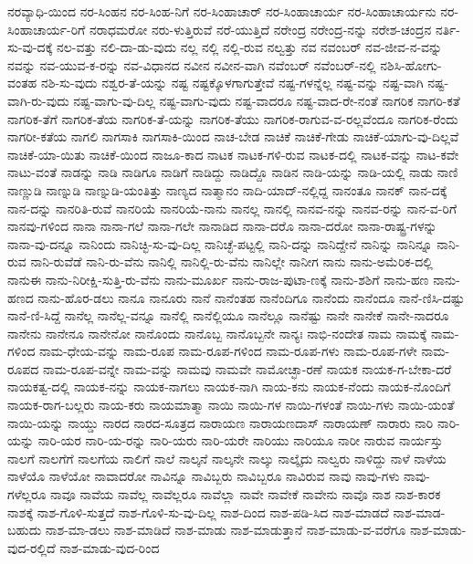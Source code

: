 {ನರವ್ಯಾಧಿ-ಯಿಂದ
ನರ-ಸಿಂಹನ
ನರ-ಸಿಂಹ-ನಿಗೆ
ನರ-ಸಿಂಹಾಚಾರ್
ನರ-ಸಿಂಹಾಚಾರ್ಯ
ನರ-ಸಿಂಹಾಚಾರ್ಯನು
ನರ-ಸಿಂಹಾಚಾರ್ಯ-ರಿಗೆ
ನರಾಧಮರೋ
ನರು-ಳುತ್ತಿರುವೆ
ನರೆ-ಯುತ್ತಿದೆ
ನರೇಂದ್ರ
ನರೇಂದ್ರ-ನನ್ನು
ನರೇಶ-ಚಂದ್ರನ
ನರ್ತಿ-ಸು-ವು-ದಕ್ಕೆ
ನಲ-ವತ್ತು
ನಲಿ-ದಾ-ಡು-ವುದು
ನಲ್ಲ
ನಲ್ಲಿ
ನಲ್ಲಿ-ರುವ
ನಲ್ವತ್ತು
ನವ
ನವಂಬರ್
ನವ-ಜೀವ-ನ-ವನ್ನು
ನವನ್ನು
ನವ-ಯುವ-ಕ-ರನ್ನು
ನವ-ವಿಧಾನದ
ನವೀನ
ನವೀನ-ವಾಗಿ
ನವೆಂಬರ್
ನವೆಂಬರ್-ನಲ್ಲಿ
ನಶಿಸಿ-ಹೋಗು-ವಂತಹ
ನಶಿ-ಸು-ವುದು
ನಶ್ವರ-ತೆ-ಯನ್ನು
ನಷ್ಟ
ನಷ್ಟಕ್ಕೊಳಗಾಗುತ್ತೇವೆ
ನಷ್ಟ-ಗಳನ್ನೆಲ್ಲ
ನಷ್ಟ-ವನ್ನು
ನಷ್ಟ-ವಾಗಿ
ನಷ್ಟ-ವಾಗಿ-ರು-ವುದು
ನಷ್ಟ-ವಾಗು-ವು-ದಿಲ್ಲ
ನಷ್ಟ-ವಾಗು-ವುದು
ನಷ್ಟ-ವಾದರೂ
ನಷ್ಟ-ವಾದ-ರೇ-ನಂತೆ
ನಾಗರಿಕ
ನಾಗರಿ-ಕತೆ
ನಾಗರಿಕ-ತೆಗೆ
ನಾಗರಿಕ-ತೆಯ
ನಾಗರಿಕ-ತೆ-ಯನ್ನು
ನಾಗರಿಕ-ತೆಯು
ನಾಗರಿಕ-ರಾಗುವ-ವ-ರಲ್ಲವೆಂದೂ
ನಾಗರಿಕ-ರೆಂದು
ನಾಗರೀ-ಕತೆಯ
ನಾಗಲಿ
ನಾಗಸಾಕಿ
ನಾಗಸಾಕಿ-ಯಿಂದ
ನಾಚ-ಬೇಡ
ನಾಚಿಕೆ
ನಾಚಿಕೆ-ಗೇಡು
ನಾಚಿಕೆ-ಯಾಗು-ವು-ದಿಲ್ಲವೆ
ನಾಚಿಕೆ-ಯಾ-ಯಿತು
ನಾಚಿಕೆ-ಯಿಂದ
ನಾಜೂ-ಕಾದ
ನಾಟಕ
ನಾಟಕ-ಗಳಿ-ರುವ
ನಾಟಕ-ದಲ್ಲಿ
ನಾಟಕ-ವನ್ನು
ನಾಟ-ಕವೇ
ನಾಟು-ವಂತೆ
ನಾಡನ್ನು
ನಾಡಿ
ನಾಡಿಗೂ
ನಾಡಿಗೆ
ನಾಡಿದ್ದು
ನಾಡಿದ್ದೊ
ನಾಡಿನ
ನಾಡಿ-ಯನ್ನು
ನಾಡಿ-ಯಲ್ಲಿ
ನಾಡು
ನಾಣಿ
ನಾಣ್ಣುಡಿ
ನಾಣ್ನುಡಿ
ನಾಣ್ನುಡಿ-ಯಂತಿತ್ತು
ನಾಣ್ಯದ
ನಾತ್ಮಾನಂ
ನಾದಿ-ಯಾದ್-ನಲ್ಲಿದ್ದ
ನಾನಂತೂ
ನಾನಕ್
ನಾನ-ದಕ್ಕೆ
ನಾನ-ದನ್ನು
ನಾನರಿತಿ-ರುವೆ
ನಾನರಿಯೆ
ನಾನರಿಯೆ-ನಾನು
ನಾನಲ್ಲ
ನಾನಲ್ಲಿ
ನಾನವ-ನನ್ನು
ನಾನವ-ರನ್ನು
ನಾನ-ವ-ರಿಗೆ
ನಾನವು-ಗಳಿಂದ
ನಾನಾ
ನಾನಾ-ಗಲೆ
ನಾನಾ-ಗಲೇ
ನಾನಾಡಿದ
ನಾನಾ-ದರೊ
ನಾನಾ-ದರೋ
ನಾನಾ-ರಾಷ್ಟ್ರ-ಗಳನ್ನು
ನಾನಾ-ವು-ದನ್ನೂ
ನಾನಿಂದು
ನಾನಿಚ್ಛಿ-ಸು-ವು-ದಿಲ್ಲ
ನಾನಿಚ್ಛೆ-ಪಟ್ಟಲ್ಲಿ
ನಾನಿ-ದನ್ನು
ನಾನಿದ್ದೇನೆ
ನಾನಿನ್ನು
ನಾನಿನ್ನೂ
ನಾನಿ-ರುವ
ನಾನಿ-ರುವೆಡೆ
ನಾನಿ-ರು-ವೆನು
ನಾನಿಲ್ಲಿ
ನಾನಿಲ್ಲಿ-ರು-ವೆನು
ನಾನಿಲ್ಲೇ
ನಾನೀಗ
ನಾನು
ನಾನು-ಅಮೆರಿಕ-ದಲ್ಲಿ
ನಾನುಈ
ನಾನು-ನಿರೀಕ್ಷಿ-ಸುತ್ತಿ-ರು-ವೆನು
ನಾನು-ಮೂರ್ಖ
ನಾನು-ರಾಜ-ಪುಟಾ-ಣಕ್ಕೆ
ನಾನು-ಶಶಿಗೆ
ನಾನು-ಹಣ
ನಾನು-ಹಣದ
ನಾನು-ಹೊರ-ಡಲು
ನಾನೂ
ನಾನೂರು
ನಾನೆ
ನಾನೆಂತಹ
ನಾನೆಂದಿಗೂ
ನಾನೆಂದು
ನಾನೆಂದೂ
ನಾನೆ-ಣಿಸಿ-ದಷ್ಟು
ನಾನೆ-ಣಿ-ಸಿದ್ದೆ
ನಾನೆಲ್ಲ
ನಾನೆಲ್ಲ-ವನ್ನೂ
ನಾನೆಲ್ಲಿ
ನಾನೆಲ್ಲಿಯೂ
ನಾನೆಲ್ಲೂ
ನಾನೆಷ್ಟು
ನಾನೇ
ನಾನೇಕೆ
ನಾನೇ-ನಾದರೂ
ನಾನೇನು
ನಾನೇನೂ
ನಾನೇನೋ
ನಾನೊಂದು
ನಾನೊಬ್ಬ
ನಾನೊಬ್ಬನೇ
ನಾನ್ಯಃ
ನಾಭಿ-ನಂದೇತ
ನಾಮ
ನಾಮಕ್ಕೆ
ನಾಮ-ಗಳಿಂದ
ನಾಮ-ಧೇಯ-ವನ್ನು
ನಾಮ-ರೂಪ
ನಾಮ-ರೂಪ-ಗಳಿಂದ
ನಾಮ-ರೂಪ-ಗಳು
ನಾಮ-ರೂಪ-ಗಳೇ
ನಾಮ-ರೂಪದ
ನಾಮ-ರೂಪ-ವನ್ನೇ
ನಾಮ-ವನ್ನು
ನಾಮವು
ನಾಮವೇ
ನಾಮೋಚ್ಛಾ-ರಣೆ
ನಾಯಕ
ನಾಯಕ-ಗ-ಬೇಕಾ-ದರೆ
ನಾಯಕತ್ವ-ದಲ್ಲಿ
ನಾಯಕ-ನನ್ನು
ನಾಯಕ-ನಾಗಲು
ನಾಯಕ-ನಾಗಿ
ನಾಯ-ಕನು
ನಾಯಕ-ನೆಂದು
ನಾಯಕ-ನೊಂದಿಗೆ
ನಾಯಕ-ರಾಗ-ಬಲ್ಲರು
ನಾಯ-ಕರು
ನಾಯಮಾತ್ಮಾ
ನಾಯಿ
ನಾಯಿ-ಗಳ
ನಾಯಿ-ಗಳಂತೆ
ನಾಯಿ-ಗಳು
ನಾಯಿ-ಯಂತೆ
ನಾಯಿ-ಯನ್ನು
ನಾಯ್ಡು
ನಾರದ
ನಾರದ-ಸೂತ್ರದ
ನಾರಾಯಣ
ನಾರಾಯಣದಾಸ್
ನಾರಾಯಣ್
ನಾರಾರು
ನಾರಿ
ನಾರಿ-ಯನ್ನು
ನಾರಿ-ಯರ
ನಾರಿ-ಯ-ರನ್ನು
ನಾರಿ-ಯರು
ನಾರಿ-ಯರೇ
ನಾರಿಯು
ನಾರಿಯೂ
ನಾರೀ
ನಾರುವ
ನಾರ್ಯಸ್ತು
ನಾಲಗೆ
ನಾಲಗೆಗೆ
ನಾಲಗೆಯ
ನಾಲಿಗೆ
ನಾಲೆ
ನಾಲ್ಕನೆ
ನಾಲ್ಕನೇ
ನಾಲ್ಕು
ನಾಲ್ಕೈದು
ನಾಲ್ವರು
ನಾಳಿದ್ದು
ನಾಳೆ
ನಾಳೆಯ
ನಾಳೆಯೊ
ನಾಳೆಯೋ
ನಾವಾದರೋ
ನಾವಿನ್ನೂ
ನಾವಿಬ್ಬರು
ನಾವಿಬ್ಬರೂ
ನಾವಿರುವ
ನಾವು
ನಾವು-ಗಳು
ನಾವು-ಗಳೆಲ್ಲರೂ
ನಾವೂ
ನಾವೆಯ
ನಾವೆಲ್ಲ
ನಾವೆಲ್ಲರೂ
ನಾವೆಲ್ಲಾ
ನಾವೇ
ನಾವೇಕೆ
ನಾವೇನು
ನಾವೊ
ನಾಶ
ನಾಶ-ಕಾರಕ
ನಾಶಕ್ಕೆ
ನಾಶ-ಗೊಳಿ-ಸುತ್ತದೆ
ನಾಶ-ಗೊಳಿ-ಸು-ವು-ದಿಲ್ಲ
ನಾಶ-ದಿಂದ
ನಾಶ-ಪಡಿ-ಸಿದ
ನಾಶ-ಮಾಡದೆ
ನಾಶ-ಮಾಡ-ಬಹುದು
ನಾಶ-ಮಾ-ಡಲು
ನಾಶ-ಮಾಡಿದೆ
ನಾಶ-ಮಾಡು
ನಾಶ-ಮಾಡುತ್ತಾನೆ
ನಾಶ-ಮಾಡು-ವ-ವರೆಗೂ
ನಾಶ-ಮಾಡು-ವುದ-ರಲ್ಲಿದೆ
ನಾಶ-ಮಾಡು-ವುದ-ರಿಂದ
}

